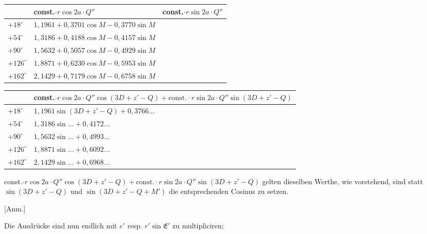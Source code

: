 \documentclass[12pt,a4paper]{article}
\begin{document}
\begin{center}
\begin{tabular}{l@{\quad}l@{\quad}l}
\toprule
& const.$\cdot r \cos 2a \cdot Q''$ & const.$\cdot r \sin 2a \cdot Q''$ \\
\midrule
$+18^\circ$ & $1{,}1961 + 0{,}3701\cos M - 0{,}3770\sin M$\\
$+54^\circ$ & $1{,}3186 + 0{,}4188\cos M - 0{,}4157\sin M$\\
$+90^\circ$ & $1{,}5632 + 0{,}5057\cos M - 0{,}4929\sin M$\\
$+126^\circ$ & $1{,}8871 + 0{,}6230\cos M - 0{,}5953\sin M$\\
$+162^\circ$ & $2{,}1429 + 0{,}7179\cos M - 0{,}6758\sin M$\\
\bottomrule
\end{tabular}
\end{center}

\begin{center}
\begin{tabular}{l@{\quad}l}
\toprule
& const.$\cdot r \cos 2a \cdot Q'' \cos(3D + z' - Q) + \text{const.} \cdot r \sin 2a \cdot Q'' \sin(3D + z' - Q)$ \\
\midrule
$+18^\circ$ & $1{,}1961 \sin(3D + z' - Q) + 0{,}3766 \ldots$\\
$+54^\circ$ & $1{,}3186 \sin \ldots + 0{,}4172 \ldots$\\
$+90^\circ$ & $1{,}5632 \sin \ldots + 0{,}4993 \ldots$\\
$+126^\circ$ & $1{,}8871 \sin \ldots + 0{,}6092 \ldots$\\
$+162^\circ$ & $2{,}1429 \sin \ldots + 0{,}6968 \ldots$\\
\bottomrule
\end{tabular}
\end{center}

const.$\cdot r \cos 2a \cdot Q'' \cos(3D + z' - Q) + \text{const.} \cdot r \sin 2a \cdot Q'' \sin(3D + z' - Q)$ gelten dieselben Werthe, wie vorstehend, sind statt $\sin(3D + z' - Q)$ und $\sin(3D + z' - Q + M')$ die entsprechenden Cosinus zu setzen.

\newpage
\setcounter{page}{416}
%
[Anm.]

Die Ausdrücke sind nun endlich mit $e'$ resp. $r'\sin \mathfrak{E}'$ zu multipliciren;
\end{document}
